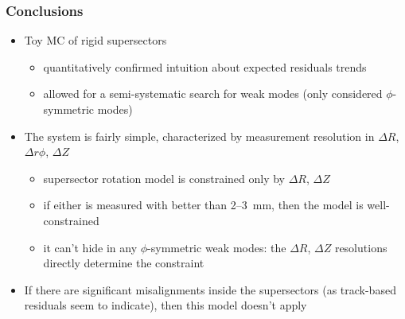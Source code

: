 \documentclass[compress]{beamer}
\begin{document}
\begin{frame}
\frametitle{Conclusions}
\begin{itemize}
\item Toy MC of rigid supersectors
\begin{itemize}
\item quantitatively confirmed intuition about expected residuals trends
\item allowed for a semi-systematic search for weak modes (only considered $\phi$-symmetric modes)
\end{itemize}

\item The system is fairly simple, characterized by measurement
  resolution in $\Delta R$, $\Delta r\phi$, $\Delta Z$
\begin{itemize}
\item supersector rotation model is constrained only by $\Delta R$, $\Delta Z$
\item if either is measured with better than 2--3~mm, then the model
  is well-constrained
\item it can't hide in any $\phi$-symmetric weak modes: the $\Delta
  R$, $\Delta Z$ resolutions directly determine the constraint
\end{itemize}

\item If there are significant misalignments inside the supersectors
  (as track-based residuals seem to indicate), then this model doesn't apply
\end{itemize}
\label{numpages}
\end{frame}



\end{document}
